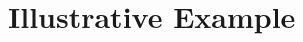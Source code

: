 \documentclass[preprint,12pt, a4paper]{elsarticle}
\newcommand{\1}{{\rm 1\hspace{-0.9mm}l}}
\newcommand{\Id}{{\rm 1\hspace{-0.9mm}l}}
\newcommand{\HH}{\mathcal{H}}
\newcommand{\tr}{\mathrm{tr}}
\begin{document}
%





\section{Illustrative Example}
\end{document}
